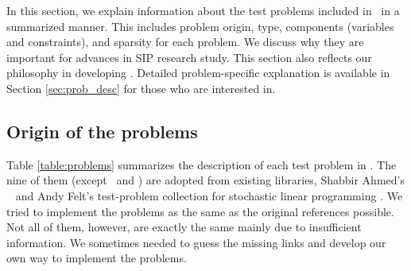 In this section, we explain information about the test problems included in \siplibtwo\ in a summarized manner. This includes problem origin, type, components (variables and constraints), and sparsity for each problem. We discuss why they are important for advances in SIP research study. This section also reflects our philosophy in developing \siplibtwo. Detailed problem-specific explanation is available in Section \ref{sec:prob_desc} for those who are interested in.

\subsection{Origin of the problems}
Table \ref{table:problems} summarizes the description of each test problem in \siplibtwo. The nine of them (except \sdcp\ and \suc) are adopted from existing libraries, Shabbir Ahmed's \siplib\ \cite{web:SIPLIB1} and Andy Felt's test-problem collection for stochastic linear programming \cite{journal:AF2004}. We tried to implement the problems as the same as the original references possible. Not all of them, however, are exactly the same mainly due to insufficient information. We sometimes needed to guess the missing links and develop our own way to implement the problems. 


